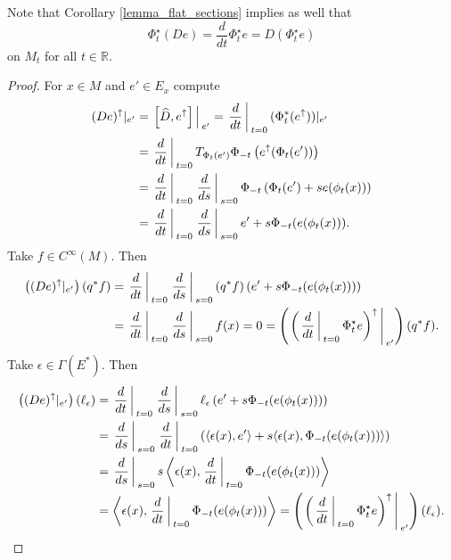 \documentclass{amsart}
\theoremstyle{plain}
\newcommand{\an}[1]{\arrowvert_{#1}}
\begin{document}
Note that Corollary \ref{lemma_flat_sections} implies as well that 
\begin{equation}\label{eq_d_flow}
\Phi_t^\star(De)=\frac{d}{dt}\Phi_t^\star e=D(\Phi_t^\star e)
\end{equation}
on $M_t$ for all $t\in\mathbb R$.

\begin{proof}
For  $x\in M$ and $e'\in E_x$ compute
\begin{equation*}
\begin{split}
(De)^\uparrow \an{e'} &=\left.\left[ \widehat D, e^\uparrow\right]\right\an{e'}=\left.\frac{d}{dt}\right\an{t=0}(\Phi_t^*(e^\uparrow))\an{e'}\\
&= \left.\frac{d}{dt}\right\an{t=0} T_{\Phi_t(e')}\Phi_{-t}\left( e^\uparrow (\Phi_t(e'))\right)\\
&=  \left.\frac{d}{dt}\right\an{t=0} \left.\frac{d}{ds}\right\an{s=0}\Phi_{-t}\left( \Phi_t(e')+se(\phi_t(x))\right)\\
&=  \left.\frac{d}{dt}\right\an{t=0} \left.\frac{d}{ds}\right\an{s=0}e'+s \Phi_{-t}(e(\phi_t(x))).
\end{split}
\end{equation*}
Take $f\in C^\infty(M)$. Then 
\begin{equation*}
\begin{split}
\left((De)^\uparrow \an{e'}\right)(q^*f) &= \left.\frac{d}{dt}\right\an{t=0} \left.\frac{d}{ds}\right\an{s=0}(q^*f)\left(e'+s \Phi_{-t}(e(\phi_t(x)))\right)\\
&=\left.\frac{d}{dt}\right\an{t=0}\left.\frac{d}{ds}\right\an{s=0}f(x)=0=\left(\left.\left(\left.\frac{d}{dt}\right\an{t=0}\Phi_t^\star e\right)^\uparrow\right\an{e'}\right)(q^*f).
\end{split}
\end{equation*}
Take $\epsilon\in\Gamma(E^*)$. Then 
\begin{equation*}
\begin{split}
\left((De)^\uparrow \an{e'}\right)(\ell_\epsilon) &= \left.\frac{d}{dt}\right\an{t=0} \left.\frac{d}{ds}\right\an{s=0}\ell_\epsilon\left(e'+s \Phi_{-t}(e(\phi_t(x)))\right)\\
&= \left.\frac{d}{ds}\right\an{s=0} \left.\frac{d}{dt}\right\an{t=0}\left(\left\langle\epsilon(x), e'\rangle +s \langle\epsilon(x),\Phi_{-t}(e(\phi_t(x)))\right\rangle\right)\\
&=\left.\frac{d}{ds}\right\an{s=0}s \left\langle\epsilon(x), \left.\frac{d}{dt}\right\an{t=0}\Phi_{-t}(e(\phi_t(x)))\right\rangle\\
&=\left\langle\epsilon(x), \left.\frac{d}{dt}\right\an{t=0}\Phi_{-t}(e(\phi_t(x)))\right\rangle
=\left(\left.\left(\left.\frac{d}{dt}\right\an{t=0}\Phi_t^\star e\right)^\uparrow\right\an{e'}\right)(\ell_\epsilon). \qedhere
\end{split}
\end{equation*}
\end{proof}
\end{document}
